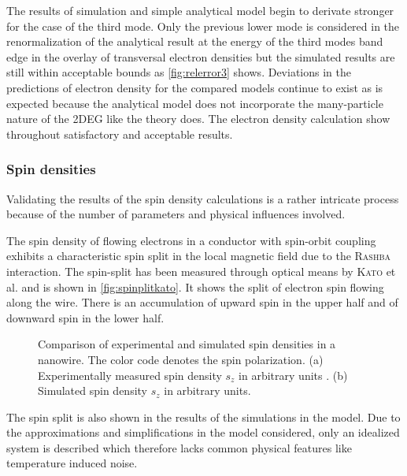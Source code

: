 The results of simulation and simple analytical model begin to derivate stronger for the case of the third mode. Only the previous lower mode is considered in the renormalization of the analytical result at the energy of the third modes band edge in the overlay of transversal electron densities but the simulated results are still within acceptable bounds as \cref{fig:relerror3} shows. Deviations in the predictions of electron density for the compared models continue to exist as is expected because the analytical model does not incorporate the many-particle nature of the 2DEG like the \gfnc{} theory does.
The electron density calculation show throughout satisfactory and acceptable results.\par
\FloatBarrier
\subsubsection{Spin densities}
Validating the results of the spin density calculations is a rather intricate process because of the number of parameters and physical influences involved.\par
The spin density of flowing electrons in a conductor with spin-orbit coupling exhibits a characteristic spin split in the local magnetic field due to the \textsc{Rashba} interaction. The spin-split has been measured through optical means by \textsc{Kato} et al. \cite{Kato2004Science} and is shown in \cref{fig:spinplitkato}. It shows the split of electron spin flowing along the wire. There is an accumulation of upward spin in the upper half and of downward spin in the lower half.
\begin{figure}[h]
  \begin{center}
    \qquad
    \qquad
    \caption{Comparison of experimental and simulated spin densities in a nanowire. The color code denotes the spin polarization. (a) Experimentally measured spin density $s_z$ in arbitrary units \cite{Kato2004Science}. (b) Simulated spin density $s_z$ in arbitrary units.}
  \end{center}
\end{figure}
The spin split is also shown in the results of the simulations in the \gfnc{} model. Due to the approximations and simplifications in the model considered, only an idealized system is described which therefore lacks common physical features like temperature induced noise.\par
\FloatBarrier
